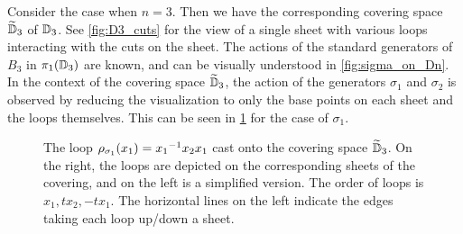 \begin{example}\label{ex:Burau_D3}
    Consider the case when $n=3$. Then we have the corresponding covering space $\widetilde{\mathbb{D}}_3$ of $\mathbb{D}_3$. See \cref{fig:D3_cuts} for the view of a single sheet with various loops interacting with the cuts on the sheet. The actions of the standard generators of $B_3$ in $\pi_1(\mathbb{D}_3)$ are known, and can be visually understood in \cref{fig:sigma_on_Dn}. In the context of the covering space $\widetilde{\mathbb{D}}_3$, the action of the generators $\sigma_1$ and $\sigma_2$ is observed by reducing the visualization to only the base points on each sheet and the loops themselves. This can be seen in \cref{fig:Burau_D3} for the case of $\sigma_1$.
    
    \begin{figure}[h!]
        \centering
        
        \caption{The loop $\rho_{\sigma_1}(x_1) = { x_1 }^{-1}x_2 x_1$ cast onto the covering space $\widetilde{\mathbb{D}}_3$. On the right, the loops are depicted on the corresponding sheets of the covering, and on the left is a simplified version. The order of loops is $x_1,tx_2,-tx_1$. The horizontal lines on the left indicate the edges taking each loop up/down a sheet.}\label{fig:Burau_D3}
    \end{figure}


\end{example}

